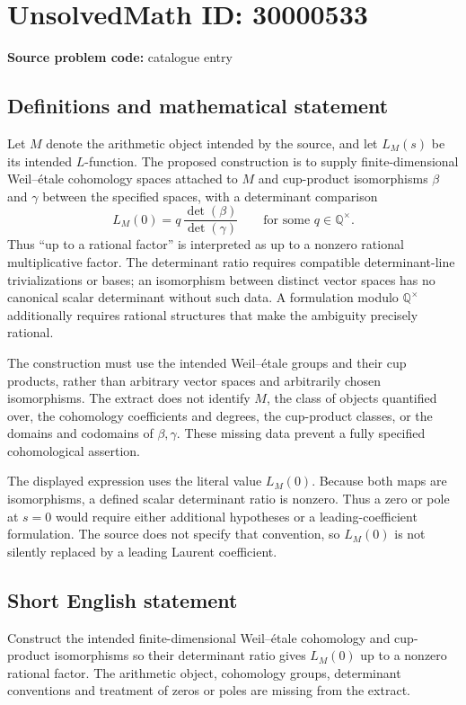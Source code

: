 \documentclass[11pt]{article}
\newcommand{\Q}{\mathbb{Q}}
\begin{document}
\section*{UnsolvedMath ID: 30000533}
\textbf{Source problem code:} catalogue entry
\subsection{Definitions and mathematical statement}
Let $M$ denote the arithmetic object intended by the source, and let $L_M(s)$ be its intended $L$-function. The proposed construction is to supply finite-dimensional Weil--étale cohomology spaces attached to $M$ and cup-product isomorphisms $\beta$ and $\gamma$ between the specified spaces, with a determinant comparison
\[
L_M(0)=q\,\frac{\det(\beta)}{\det(\gamma)}
\qquad\text{for some }q\in\Q^\times.
\]
Thus ``up to a rational factor'' is interpreted as up to a nonzero rational multiplicative factor. The determinant ratio requires compatible determinant-line trivializations or bases; an isomorphism between distinct vector spaces has no canonical scalar determinant without such data. A formulation modulo $\Q^\times$ additionally requires rational structures that make the ambiguity precisely rational.

The construction must use the intended Weil--étale groups and their cup products, rather than arbitrary vector spaces and arbitrarily chosen isomorphisms. The extract does not identify $M$, the class of objects quantified over, the cohomology coefficients and degrees, the cup-product classes, or the domains and codomains of $\beta,\gamma$. These missing data prevent a fully specified cohomological assertion.

The displayed expression uses the literal value $L_M(0)$. Because both maps are isomorphisms, a defined scalar determinant ratio is nonzero. Thus a zero or pole at $s=0$ would require either additional hypotheses or a leading-coefficient formulation. The source does not specify that convention, so $L_M(0)$ is not silently replaced by a leading Laurent coefficient.
\subsection{Short English statement}
Construct the intended finite-dimensional Weil--étale cohomology and cup-product isomorphisms so their determinant ratio gives $L_M(0)$ up to a nonzero rational factor. The arithmetic object, cohomology groups, determinant conventions and treatment of zeros or poles are missing from the extract.
\end{document}
